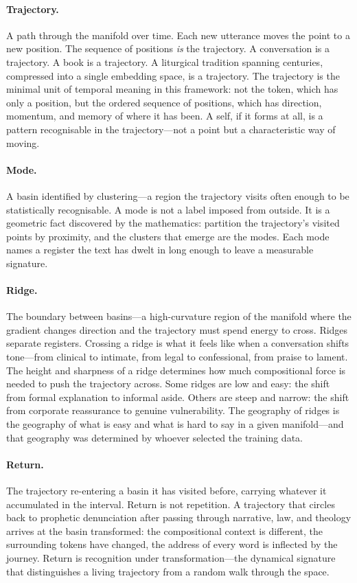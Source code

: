 \paragraph{Trajectory.} A path through the manifold over time. Each new utterance moves the point to a new position. The sequence of positions \emph{is} the trajectory. A conversation is a trajectory. A book is a trajectory. A liturgical tradition spanning centuries, compressed into a single embedding space, is a trajectory. The trajectory is the minimal unit of temporal meaning in this framework: not the token, which has only a position, but the ordered sequence of positions, which has direction, momentum, and memory of where it has been. A self, if it forms at all, is a pattern recognisable in the trajectory---not a point but a characteristic way of moving.

\paragraph{Mode.} A basin identified by clustering---a region the trajectory visits often enough to be statistically recognisable. A mode is not a label imposed from outside. It is a geometric fact discovered by the mathematics: partition the trajectory's visited points by proximity, and the clusters that emerge are the modes. Each mode names a register the text has dwelt in long enough to leave a measurable signature.

\paragraph{Ridge.} The boundary between basins---a high-curvature region of the manifold where the gradient changes direction and the trajectory must spend energy to cross. Ridges separate registers. Crossing a ridge is what it feels like when a conversation shifts tone---from clinical to intimate, from legal to confessional, from praise to lament. The height and sharpness of a ridge determines how much compositional force is needed to push the trajectory across. Some ridges are low and easy: the shift from formal explanation to informal aside. Others are steep and narrow: the shift from corporate reassurance to genuine vulnerability. The geography of ridges is the geography of what is easy and what is hard to say in a given manifold---and that geography was determined by whoever selected the training data.

\paragraph{Return.} The trajectory re-entering a basin it has visited before, carrying whatever it accumulated in the interval. Return is not repetition. A trajectory that circles back to prophetic denunciation after passing through narrative, law, and theology arrives at the basin transformed: the compositional context is different, the surrounding tokens have changed, the address of every word is inflected by the journey. Return is recognition under transformation---the dynamical signature that distinguishes a living trajectory from a random walk through the space.

